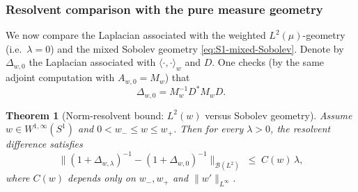 \documentclass{amsart}
\numberwithin{equation}{section}
\newtheorem{theorem}{Theorem}[section]
\theoremstyle{definition}
\theoremstyle{remark}
\begin{document}
\subsubsection{Resolvent comparison with the pure measure geometry}

We now compare the Laplacian associated with the weighted $L^2(\mu)$-geometry
(i.e.\ $\lambda=0$) and the mixed Sobolev geometry \eqref{eq:S1-mixed-Sobolev}.
Denote by $\Delta_{w,0}$ the Laplacian associated with $\langle\cdot,\cdot \rangle_w$ and $D$.
One checks (by the same adjoint computation with $A_{w,0}=M_w$) that
\begin{equation}\label{eq:Delta-w-0}
\Delta_{w,0} = M_w^{-1} D^* M_w D.
\end{equation}

\begin{theorem}[Norm-resolvent bound: $L^2(w)$ versus Sobolev geometry]\label{thm:S1-resolvent-bound}
Assume $w\in W^{1,\infty}(S^1)$ and $0<w_-\le w\le w_+$. Then for every $\lambda>0$,
the resolvent difference satisfies
\begin{equation}\label{eq:resolvent-bound-S1}
\big\|(1+\Delta_{w,\lambda})^{-1}-(1+\Delta_{w,0})^{-1}\big\|_{\mathcal B(L^2)}
\;\le\;
C(w)\,\lambda,
\end{equation}
where $C(w)$ depends only on $w_-,w_+$ and $\|w'\|_{L^\infty}$.
\end{theorem}
\end{document}
